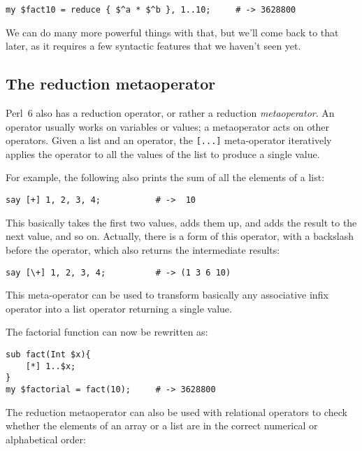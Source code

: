 \begin{verbatim}
my $fact10 = reduce { $^a * $^b }, 1..10;     # -> 3628800
\end{verbatim}
%

We can do many more powerful things with that, but we'll come 
back to that later, as it requires a few syntactic features that 
we haven't seen yet.

\subsection{The reduction metaoperator}

Perl~6 also has a reduction operator, 
or rather a reduction \emph{metaoperator}. An operator 
usually works on variables or values; a metaoperator acts 
on other operators. Given a list and an operator, the 
\verb'[...]' meta-operator iteratively applies the operator 
to all the values of the list to produce a single value.

For example, the following also prints the sum of all the 
elements of a list:

\begin{verbatim}
say [+] 1, 2, 3, 4;           # ->  10
\end{verbatim}

This basically takes the first two values, adds them up, 
and adds the result to the next value, and so on. Actually, 
there is a form of this operator, with a backslash before 
the operator, which also returns the intermediate results:

\begin{verbatim}
say [\+] 1, 2, 3, 4;          # -> (1 3 6 10)
\end{verbatim}

This meta-operator can be used to transform basically any 
associative infix operator into a list operator returning 
a single value.

The factorial function can now be rewritten as:

\begin{verbatim}
sub fact(Int $x){
    [*] 1..$x; 
}
my $factorial = fact(10);     # -> 3628800
\end{verbatim}

The reduction metaoperator can also be used with relational 
operators to check whether the elements of an array or a list 
are in the correct numerical or alphabetical order:

